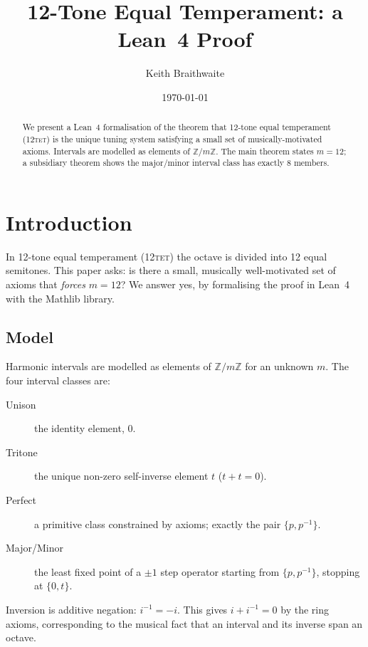 \documentclass{amsart}
\title{12-Tone Equal Temperament: a Lean~4 Proof}
\author{Keith Braithwaite}
\date{\today}
\begin{document}
\maketitle

\begin{abstract}
We present a Lean~4 formalisation of the theorem that 12-tone equal
temperament (\textsc{12tet}) is the unique tuning system satisfying a
small set of musically-motivated axioms.  Intervals are modelled as
elements of $\mathbb{Z}/m\mathbb{Z}$.  The main theorem states $m = 12$;
a subsidiary theorem shows the major/minor interval class has exactly 8
members.
\end{abstract}

\tableofcontents

\section{Introduction}
\label{sec:intro}

In 12-tone equal temperament (\textsc{12tet}) the octave is divided into
12 equal semitones.  This paper asks: is there a small, musically
well-motivated set of axioms that \emph{forces} $m = 12$?  We answer yes,
by formalising the proof in Lean~4 with the Mathlib library.

\subsection*{Model}

Harmonic intervals are modelled as elements of $\mathbb{Z}/m\mathbb{Z}$
for an unknown $m$.  The four interval classes are:

\begin{description}
  \item[Unison] the identity element, $0$.
  \item[Tritone] the unique non-zero self-inverse element $t$ ($t + t = 0$).
  \item[Perfect] a primitive class constrained by axioms; exactly the
    pair $\{p, p^{-1}\}$.
  \item[Major/Minor] the least fixed point of a $\pm 1$ step operator
    starting from $\{p, p^{-1}\}$, stopping at $\{0, t\}$.
\end{description}

Inversion is additive negation: $i^{-1} = -i$.  This gives $i + i^{-1}
= 0$ by the ring axioms, corresponding to the musical fact that an
interval and its inverse span an octave.
\end{document}
